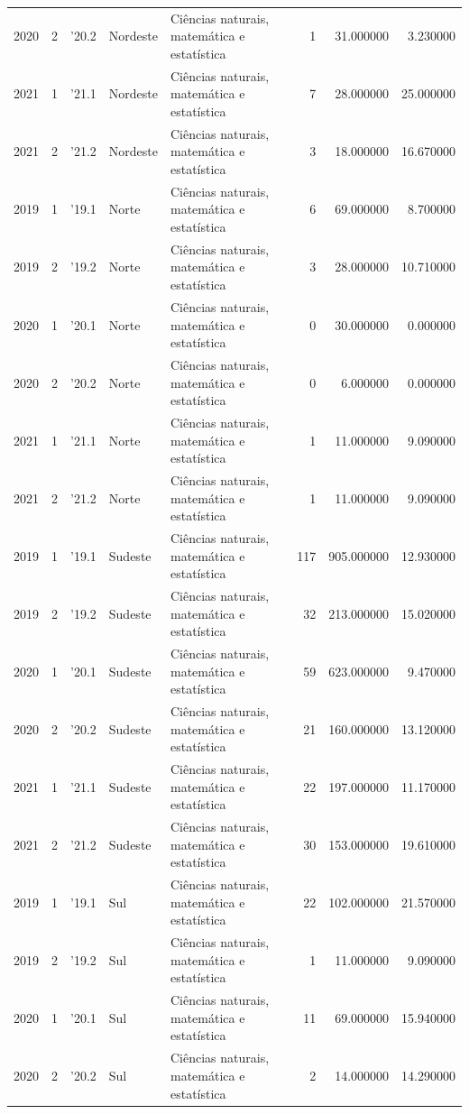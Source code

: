 \begin{longtable}{rrlllrrr}
2020 & 2 & '20.2 & Nordeste & Ciências naturais, matemática e estatística & 1 & 31.000000 & 3.230000 \\
2021 & 1 & '21.1 & Nordeste & Ciências naturais, matemática e estatística & 7 & 28.000000 & 25.000000 \\
2021 & 2 & '21.2 & Nordeste & Ciências naturais, matemática e estatística & 3 & 18.000000 & 16.670000 \\
2019 & 1 & '19.1 & Norte & Ciências naturais, matemática e estatística & 6 & 69.000000 & 8.700000 \\
2019 & 2 & '19.2 & Norte & Ciências naturais, matemática e estatística & 3 & 28.000000 & 10.710000 \\
2020 & 1 & '20.1 & Norte & Ciências naturais, matemática e estatística & 0 & 30.000000 & 0.000000 \\
2020 & 2 & '20.2 & Norte & Ciências naturais, matemática e estatística & 0 & 6.000000 & 0.000000 \\
2021 & 1 & '21.1 & Norte & Ciências naturais, matemática e estatística & 1 & 11.000000 & 9.090000 \\
2021 & 2 & '21.2 & Norte & Ciências naturais, matemática e estatística & 1 & 11.000000 & 9.090000 \\
2019 & 1 & '19.1 & Sudeste & Ciências naturais, matemática e estatística & 117 & 905.000000 & 12.930000 \\
2019 & 2 & '19.2 & Sudeste & Ciências naturais, matemática e estatística & 32 & 213.000000 & 15.020000 \\
2020 & 1 & '20.1 & Sudeste & Ciências naturais, matemática e estatística & 59 & 623.000000 & 9.470000 \\
2020 & 2 & '20.2 & Sudeste & Ciências naturais, matemática e estatística & 21 & 160.000000 & 13.120000 \\
2021 & 1 & '21.1 & Sudeste & Ciências naturais, matemática e estatística & 22 & 197.000000 & 11.170000 \\
2021 & 2 & '21.2 & Sudeste & Ciências naturais, matemática e estatística & 30 & 153.000000 & 19.610000 \\
2019 & 1 & '19.1 & Sul & Ciências naturais, matemática e estatística & 22 & 102.000000 & 21.570000 \\
2019 & 2 & '19.2 & Sul & Ciências naturais, matemática e estatística & 1 & 11.000000 & 9.090000 \\
2020 & 1 & '20.1 & Sul & Ciências naturais, matemática e estatística & 11 & 69.000000 & 15.940000 \\
2020 & 2 & '20.2 & Sul & Ciências naturais, matemática e estatística & 2 & 14.000000 & 14.290000 \\

\end{longtable}
